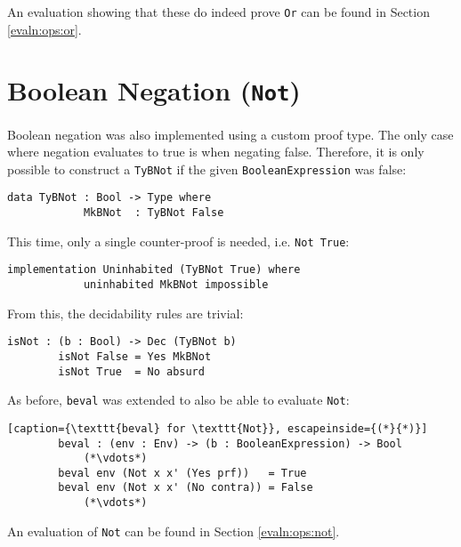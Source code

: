     An evaluation showing that these do indeed prove \texttt{Or} can be found in Section \ref{evaln:ops:or}.

\section{Boolean Negation (\texttt{Not})}
    Boolean negation was also implemented using a custom proof type. The only case where negation evaluates to true is when negating false. Therefore, it is only possible to construct a \texttt{TyBNot} if the given \texttt{BooleanExpression} was false:
    \begin{lstlisting}[caption={The proof type for \texttt{Not}}]
        data TyBNot : Bool -> Type where
            MkBNot  : TyBNot False
    \end{lstlisting}
    This time, only a single counter-proof is needed, i.e. \texttt{Not True}:
    \begin{lstlisting}[caption={Constructing \texttt{Not True} is impossible}]
        implementation Uninhabited (TyBNot True) where
            uninhabited MkBNot impossible
    \end{lstlisting}
    From this, the decidability rules are trivial:
    \begin{lstlisting}[caption={Decidability rules for \texttt{Not}}]
        isNot : (b : Bool) -> Dec (TyBNot b)
        isNot False = Yes MkBNot
        isNot True  = No absurd
    \end{lstlisting}
    As before, \texttt{beval} was extended to also be able to evaluate \texttt{Not}:
    \begin{lstlisting}[caption={\texttt{beval} for \texttt{Not}}, escapeinside={(*}{*)}]
        beval : (env : Env) -> (b : BooleanExpression) -> Bool
            (*\vdots*)
        beval env (Not x x' (Yes prf))   = True
        beval env (Not x x' (No contra)) = False
            (*\vdots*)
    \end{lstlisting}
    
    An evaluation of \texttt{Not} can be found in Section \ref{evaln:ops:not}.
    
    
